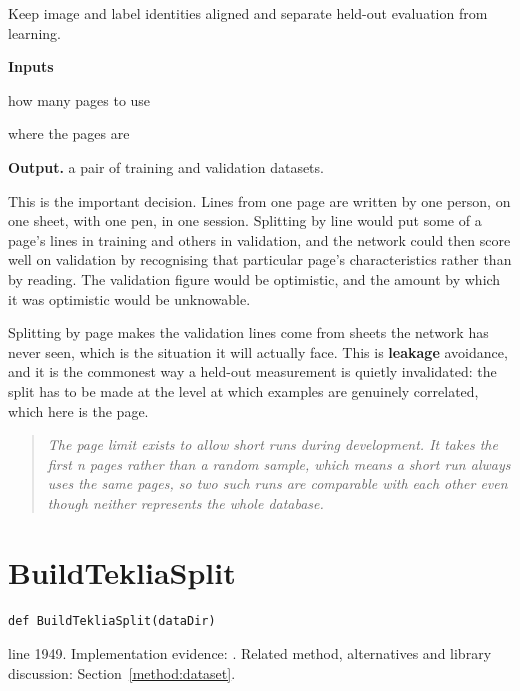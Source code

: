 Keep image and label identities aligned and separate held-out evaluation from learning.




\noindent\textbf{Inputs}
\begin{description}[leftmargin=2.2em,style=nextline,font=\normalfont\ttfamily]\setlength\itemsep{1pt}
  \item[{maxPages}] \normalfont how many pages to use
  \item[{dataDir}] \normalfont where the pages are
\end{description}

\noindent\textbf{Output.} a pair of training and validation datasets.


This is the important decision. Lines from one page are written by one person, on one sheet, with one pen, in one session. Splitting by line would put some of a page's lines in training and others in validation, and the network could then score well on validation by recognising that particular page's characteristics rather than by reading. The validation figure would be optimistic, and the amount by which it was optimistic would be unknowable.

Splitting by page makes the validation lines come from sheets the network has never seen, which is the situation it will actually face. This is \textbf{leakage} avoidance, and it is the commonest way a held-out measurement is quietly invalidated: the split has to be made at the level at which examples are genuinely correlated, which here is the page.


\begin{quote}\small\itshape The page limit exists to allow short runs during development. It takes the first n pages rather than a random sample, which means a short run always uses the same pages, so two such runs are comparable with each other even though neither represents the whole database.\end{quote}


\section{BuildTekliaSplit}\label{fn:train:BuildTekliaSplit}
\begin{lstlisting}[style=sig]
def BuildTekliaSplit(dataDir)
\end{lstlisting}
 line 1949. Implementation evidence: \cite{code2026}. Related method, alternatives and library discussion: Section~\ref{method:dataset}.



